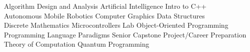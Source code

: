 \documentclass[
    10pt,
    A4,
    english,
    draft = false,
    twoside = false,
]{article}
\begin{document}
        {


        {
          Algorithm Design and Analysis \cvContactSpace Artificial Intelligence \cvContactSpace Intro to C++ \\ Autonomous Mobile Robotics \cvContactSpace Computer Graphics \cvContactSpace Data Structures \\ Discrete Mathematics \cvContactSpace Microcontrollers Lab \cvContactSpace  Object-Oriented Programming \\ Programming Language Paradigms \cvContactSpace Senior Capstone Project/Career Preparation \\ Theory of Computation \cvContactSpace Quantum Programming
        }

        
        
}
\end{document}
